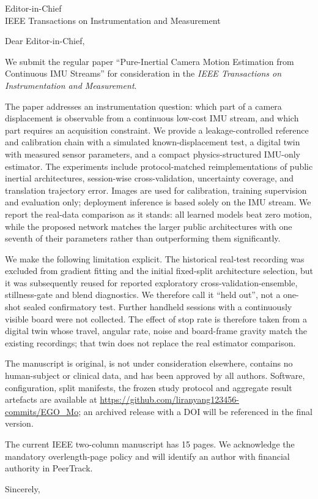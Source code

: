 ﻿\documentclass[11pt]{letter}
\begin{document}
\begin{letter}{Editor-in-Chief\\
IEEE Transactions on Instrumentation and Measurement}
\opening{Dear Editor-in-Chief,}

We submit the regular paper ``Pure-Inertial Camera Motion Estimation from
Continuous IMU Streams'' for consideration in the \emph{IEEE Transactions on
Instrumentation and Measurement}.

The paper addresses an instrumentation question: which part of a camera
displacement is observable from a continuous low-cost IMU stream, and which
part requires an acquisition constraint. We provide a leakage-controlled
reference and calibration chain with a simulated known-displacement test, a
digital twin with measured sensor parameters, and a compact physics-structured
IMU-only estimator. The experiments include protocol-matched reimplementations
of public inertial architectures, session-wise cross-validation, uncertainty
coverage, and translation trajectory error. Images are used for calibration,
training supervision and evaluation only; deployment inference is based solely
on the IMU stream. We report the real-data comparison as it stands: all learned
models beat zero motion, while the proposed network matches the larger public
architectures with one seventh of their parameters rather than outperforming
them significantly.

We make the following limitation explicit. The historical real-test recording
was excluded from gradient fitting and the initial fixed-split architecture
selection, but it was subsequently reused for reported exploratory
cross-validation-ensemble, stillness-gate and blend diagnostics. We therefore
call it ``held out'', not a one-shot sealed confirmatory test. Further
handheld sessions with a continuously visible board were not collected.
The effect of stop rate is therefore taken from a digital twin whose travel,
angular rate, noise and board-frame gravity match the existing recordings;
that twin does not replace the real estimator comparison.

The manuscript is original, is not under consideration elsewhere, contains no
human-subject or clinical data, and has been approved by all authors. Software,
configuration, split manifests, the frozen study protocol and aggregate result
artefacts are available at
\url{https://github.com/liranyang123456-commits/EGO_Mo}; an archived release
with a DOI will be referenced in the final version.

The current IEEE two-column manuscript has 15 pages. We acknowledge the
mandatory overlength-page policy and will identify an author with financial
authority in PeerTrack.

\closing{Sincerely,}
\end{letter}
\end{document}
